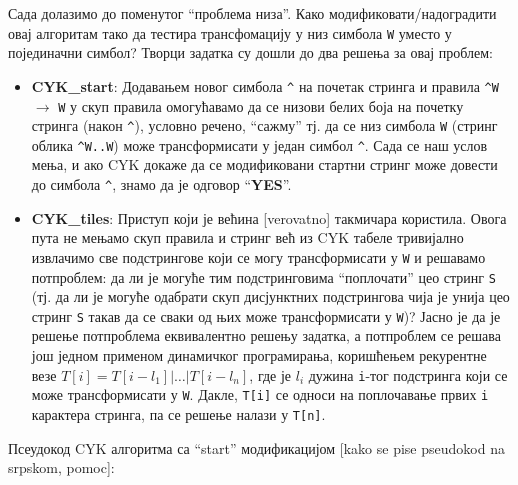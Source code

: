 \documentclass[a4wide]{article}
\begin{document}
\noindent Сада долазимо до поменутог ``проблема низа''. Како модификовати/надоградити овај алгоритам тако да тестира трансфомацију у низ симбола {\tt W} уместо у појединачни симбол? Творци задатка су дошли до два решења за овај проблем:
\begin{itemize}
\item {\bf CYK\_start}: Додавањем новог симбола \verb|^| на почетак стринга и правила \verb|^|{\tt W} $\to$ {\tt W} у скуп правила омогућавамо да се низови белих боја на почетку стринга (након \verb|^|), условно речено, ``сажму'' тј. да се низ симбола {\tt W} (стринг облика \verb|^|{\tt {W..W}}) може трансформисати у један симбол \verb|^|. Сада се наш услов мења, и ако CYK докаже да се модификовани стартни стринг може довести до симбола \verb|^|, знамо да је одговор ``{\bf YES}''.
\item {\bf CYK\_tiles}: Приступ који је већина [verovatno] такмичара користила. Овога пута не мењамо скуп правила и стринг већ из CYK табеле тривијално извлачимо све подстрингове који се могу трансформисати у {\tt W} и решавамо потпроблем: да ли је могуће тим подстринговима ``поплочати'' цео стринг {\tt S} (тј. да ли је могуће одабрати скуп дисјунктних подстрингова чија је унија цео стринг {\tt S} такав да се сваки од њих може трансформисати у {\tt W})? Јасно је да је решење потпроблема еквивалентно решењу задатка, а потпроблем се решава још једном применом динамичког програмирања, коришћењем рекурентне везе $T[i] = T[i - l_1] | \dots | T[i - l_n]$, где је $l_i$ дужина {\tt i}-тог подстринга који се може трансформисати у {\tt W}. Дакле, {\tt T[i]} се односи на поплочавање првих {\tt i} карактера стринга, па се решење налази у {\tt T[n]}.
\end{itemize}

\noindent Псеудокод CYK алгоритма са ``start'' модификацијом [kako se pise pseudokod na srpskom, pomoc]:\\
\end{document}

